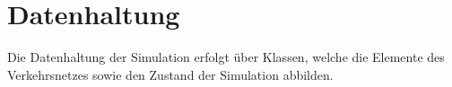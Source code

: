 \clearpage
\FloatBarrier
\begin{figure}[h!]
    \vspace{-1.5cm} 
    \centering
\end{figure}
\clearpage
\section{Datenhaltung}


Die Datenhaltung der Simulation erfolgt über Klassen, welche die Elemente des Verkehrsnetzes sowie den Zustand der Simulation abbilden.

